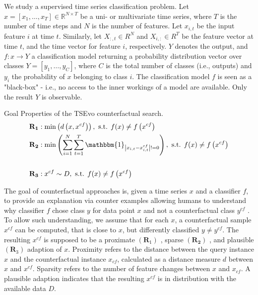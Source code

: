 We study a supervised time series classification problem. Let $x=\left[x_{1}, \ldots, x_{T}\right] \in \mathbb{R}^{N \times T}$ be a uni- or multivariate time series, where $T$ is the number of time steps and $N$ is the number of features. Let $x_{i, t}$ be the input feature $i$ at time $t$. Similarly, let $X_{:, t} \in R^{N}$ and $X_{i,:} \in R^{T}$ be the feature vector at time $t$, and the time vector for feature $i$, respectively. $Y$ denotes the output, and $f: x \rightarrow Y$ a classification model returning a probability distribution vector over classes $Y=\left[y_{1}, \ldots, y_{C}\right]$, where $C$ is the total number of classes (i.e., outputs) and $y_{i}$ the probability of $x$ belonging to class $i$. The classification model $f$ is seen as a "black-box" - i.e., no access to the inner workings of a model are available. Only the result $Y$ is observable.

\begin{definition}
Goal Properties of the TSEvo counterfactual search.
$$
\begin{aligned}
& \mathbf{R}_{\mathbf{1}}: \min \left(d\left(x, x^{c f}\right)\right), \text { s.t. } f(x) \neq f\left(x^{c f}\right) \\
& \mathbf{R}_{\mathbf{2}}: \min \left(\sum_{i=1}^{N} \sum_{t=1}^{T} \mathbbm{1}_{\left|x_{i, t}-x_{i, t}^{c f}\right| !=0}\right), \text { s.t. } f(x) \neq f\left(x^{c f}\right) \\
& \\
& \mathbf{R}_{\mathbf{3}}: x^{c f} \sim D, \text { s.t. } f(x) \neq f\left(x^{c f}\right)
\end{aligned}
$$ 
\end{definition}
The goal of counterfactual approaches is, given a time series $x$ and a classifier $f$, to provide an explanation via counter examples allowing humans to understand why classifier $f$ chose class $y$ for data point $x$ and not a counterfactual class $y^{c f}$ \cite{wachter_counterfactual_2018}. To allow such understanding, we assume that for each $x$, a counterfactual sample $x^{c f}$ can be computed, that is close to $x$, but differently classified $y \neq y^{c f}$. The resulting $x^{c f}$ is supposed to be a proximate $\left(\mathbf{R}_{1}\right)$ \cite{mothilal_explaining_2020}, sparse $\left(\mathbf{R}_{\mathbf{2}}\right)$ \cite{mothilal_explaining_2020}, and plausible $\left(\mathbf{R}_{3}\right)$ \cite{laugel_dangers_2019} adaption of $x$. Proximity refers to the distance between the query instance $x$ and the counterfactual instance $x_{c f}$, calculated as a distance measure $d$ between $x$ and $x^{c f}$. Sparsity refers to the number of feature changes between $x$ and $x_{c f}$. A plausible adaption indicates that the resulting $x^{c f}$ is in distribution with the available data $D$.

